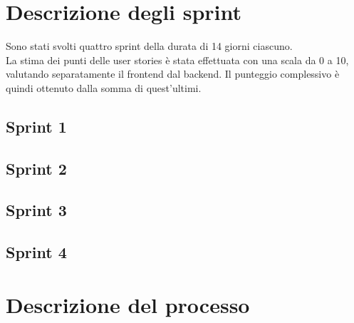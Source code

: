 \documentclass[11pt]{article}
\begin{document}

\newpage
\section{Descrizione degli sprint} \label{sprint_description}
Sono stati svolti quattro sprint della durata di 14 giorni ciascuno.\\
La stima dei punti delle user stories è stata effettuata con una scala da 0 a 10, valutando separatamente il frontend dal backend. 
Il punteggio complessivo è quindi ottenuto dalla somma di quest'ultimi.

\subsection{Sprint 1}

\newpage

\subsection{Sprint 2}

\newpage

\subsection{Sprint 3}

\newpage

\subsection{Sprint 4}

\newpage


\newpage
\section{Descrizione del processo}
\end{document}
